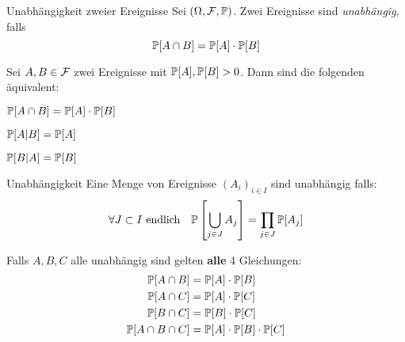 \begin{definition}{Unabhängigkeit zweier Ereignisse}
	Sei $(\Omega, \mathcal{F} , \mathbb{P})$. Zwei Ereignisse sind \emph{unabhängig}, falls 
	\begin{equation*}
		\mathbb{P} [A \cap B] = \mathbb{P} [A] \cdot \mathbb{P}[B]
	\end{equation*}
\end{definition}
Sei $A,B \in \mathcal{F}$ zwei Ereignisse mit $\mathbb{P} [A], \mathbb{P} [B] > 0$. Dann sind die folgenden äquivalent:
\begin{enumerate*}
	\item $\mathbb{P} [A \cap B] = \mathbb{P} [A] \cdot \mathbb{P} [B]$
	\item $\mathbb{P} [A | B] = \mathbb{P} [A]$
	\item $\mathbb{P} [B | A] = \mathbb{P} [B]$
\end{enumerate*}
\begin{definition}{Unabhängigkeit}
	Eine Menge von Ereignisse $(A_i)_{i \in I}$ sind unabhängig falls:
	\begin{equation*}
		\forall J \subset I ~\text{endlich}\quad \mathbb{P} \left[ \bigcup_{j \in J} A_j \right] = \prod_{j \in J} \mathbb{P} [A_j]
	\end{equation*}
\end{definition}
Falls $A,B,C$ alle unabhängig sind gelten \textbf{alle} 4 Gleichungen:
\begin{align*}
	\mathbb{P} [A \cap B] &= \mathbb{P} [A] \cdot \mathbb{P} [B]\\
	\mathbb{P} [A \cap C] &= \mathbb{P} [A] \cdot \mathbb{P} [C]\\
	\mathbb{P} [B \cap C] &= \mathbb{P} [B] \cdot \mathbb{P} [C]\\
	\mathbb{P} [A \cap B \cap C] &= \mathbb{P} [A] \cdot \mathbb{P} [B] \cdot \mathbb{P} [C]
\end{align*}
